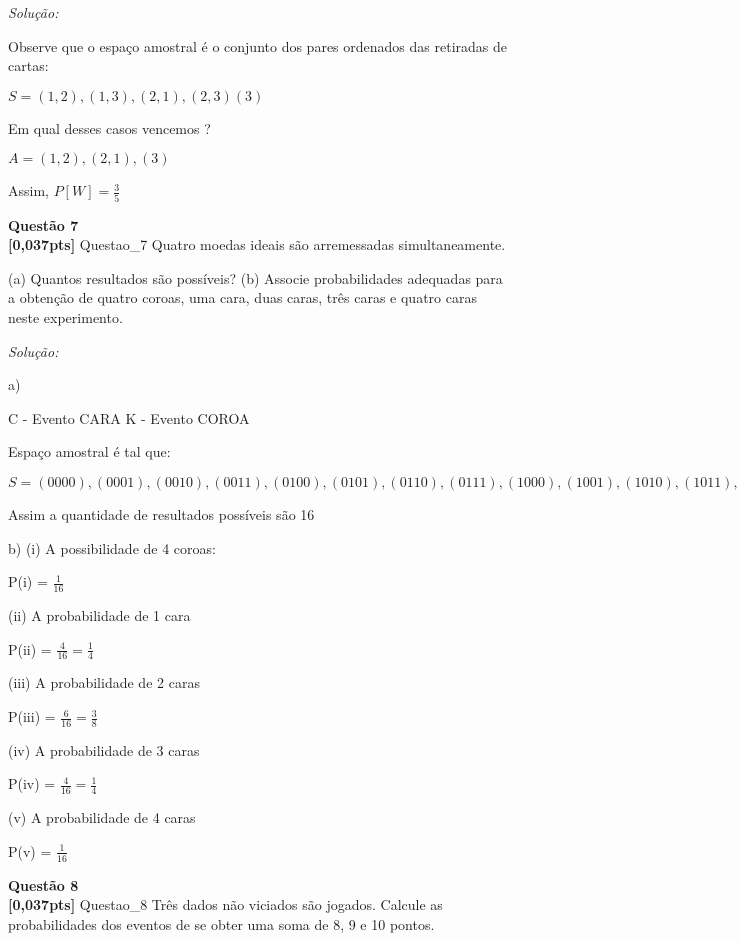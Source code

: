 \documentclass{article}
\newenvironment{problem}[2][Questão]
    { \begin{mdframed}[backgroundcolor=gray!20] \textbf{#1 #2} \\}
    {  \end{mdframed}}
\newenvironment{solution}
    {\textit{Solução:}}
    {}
\begin{document}
\begin{solution}

Observe que o espaço amostral é o conjunto dos pares ordenados das retiradas de cartas:

$S = {(1,2), (1,3), (2,1), (2,3) (3)}$

Em qual desses casos vencemos ?

$A = {(1,2), (2,1), (3)}$

Assim, $P[W] = \frac{3}{5}$

\end{solution}

\begin{problem}{7}
\textbf{[0,037pts]} Questao\_7 Quatro moedas ideais são arremessadas simultaneamente.

(a) Quantos resultados são possíveis?
(b) Associe probabilidades adequadas para a obtenção de quatro coroas, uma cara, duas caras, 
três caras e quatro caras neste experimento.

\end{problem}

\begin{solution}

a) 

C - Evento CARA
K - Evento COROA

Espaço amostral é tal que:

$S={(0000), (0001), (0010), (0011), (0100), (0101), (0110), (0111), (1000), (1001), (1010), (1011), (1100), (1101), (1110), (1111)}$

Assim a quantidade de resultados possíveis são 16

b) 
(i) A possibilidade de 4 coroas:

P(i) = $\frac{1}{16}$

(ii) A probabilidade de 1 cara

P(ii) = $\frac{4}{16} = \frac{1}{4}$

(iii) A probabilidade de 2 caras

P(iii) = $\frac{6}{16} = \frac{3}{8}$

(iv)  A probabilidade de 3 caras

P(iv) = $\frac{4}{16} = \frac{1}{4}$

(v)   A probabilidade de 4 caras

P(v) = $\frac{1}{16}$

\end{solution}

\begin{problem}{8}
\textbf{[0,037pts]} Questao\_8 Três dados não viciados são jogados. Calcule as probabilidades dos eventos de se obter uma 
soma de 8, 9 e 10 pontos. 

\end{problem}
\end{document}
